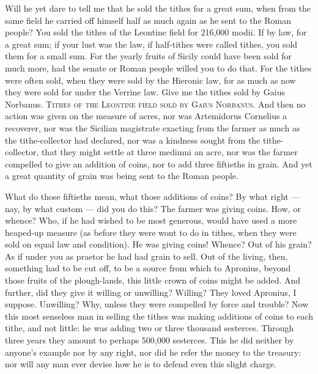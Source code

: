  Will he yet dare to tell me that he sold the tithes for a great sum, when from the same field he carried off himself half as much again as he sent to the Roman people? You sold the tithes of the Leontine field for 216,000 modii. If by law, for a great sum; if your lust was the law, if half-tithes were called tithes, you sold them for a small sum. For the yearly fruits of Sicily could have been sold for much more, had the senate or Roman people willed you to do that. For the tithes were often sold, when they were sold by the Hieronic law, for as much as now they were sold for under the Verrine law. Give me the tithes sold by Gaius Norbanus. \textsc{Tithes of the Leontine field sold by Gaius Norbanus}. And then no action was given on the measure of acres, nor was Artemidorus Cornelius a recoverer, nor was the Sicilian magistrate exacting from the farmer as much as the tithe-collector had declared, nor was a kindness sought from the tithe-collector, that they might settle at three medimni an acre, nor was the farmer compelled to give an addition of coins, nor to add three fiftieths in grain. And yet a great quantity of grain was being sent to the Roman people.

 What do those fiftieths mean, what those additions of coins? By what right --- nay, by what custom --- did you do this? The farmer was giving coins. How, or whence? Who, if he had wished to be most generous, would have used a more heaped-up measure (as before they were wont to do in tithes, when they were sold on equal law and condition). He was giving coins! Whence? Out of his grain? As if under you as praetor he had had grain to sell. Out of the living, then, something had to be cut off, to be a source from which to Apronius, beyond those fruits of the plough-lands, this little crown of coins might be added. And further, did they give it willing or unwilling? Willing? They loved Apronius, I suppose. Unwilling? Why, unless they were compelled by force and trouble? Now this most senseless man in selling the tithes was making additions of coins to each tithe, and not little: he was adding two or three thousand sesterces. Through three years they amount to perhaps 500,000 sesterces. This he did neither by anyone's example nor by any right, nor did he refer the money to the treasury: nor will any man ever devise how he is to defend even this slight charge.

